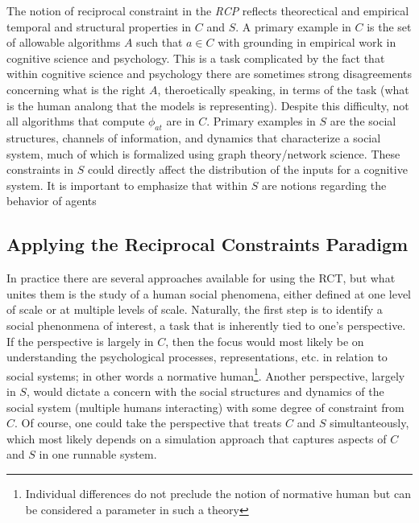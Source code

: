 \documentclass{article}
\begin{document}
The notion of reciprocal constraint in the \textit{RCP} reflects theorectical and empirical temporal and structural properties in $C$ and $S$.  A primary example in $C$ is the set of allowable algorithms $A$ such that $a \in C$ with grounding in empirical work in cognitive science and psychology.  This is a task complicated by the fact that within cognitive science and psychology there are sometimes strong disagreements concerning what is the right $A$, theroetically speaking, in terms of the task (what is the human analong that the models is representing).  Despite this difficulty, not all algorithms that compute $\phi_{at}$ are in $C$.  Primary examples in $S$ are the social structures, channels of information, and dynamics that characterize a social system, much of which is formalized using graph theory/network science.  These constraints in $S$ could directly affect the distribution of the inputs for a cognitive system.  It is important to emphasize that within $S$ are notions regarding the behavior of agents   


\subsection{Applying the Reciprocal Constraints Paradigm}   
In practice there are several approaches available for using the RCT, but what unites them is the study of a human social phenomena, either defined at one level of scale or at multiple levels of scale.  Naturally, the first step is to identify a social phenonmena of interest, a task that is inherently tied to one's perspective.  If the perspective is largely in $C$, then the focus would most likely be on understanding the psychological processes, representations, etc. in relation to social systems; in other words a normative human\footnote{Individual differences do not preclude the notion of normative human but can be considered a parameter in such a theory}.   Another perspective, largely in $S$, would dictate a concern with the social structures and dynamics of the social system (multiple humans interacting) with some degree of constraint from $C$.  Of course, one could take the perspective that treats $C$ and $S$ simultanteously, which most likely depends on a simulation approach that captures aspects of $C$ and $S$ in one runnable system.  
\end{document}
